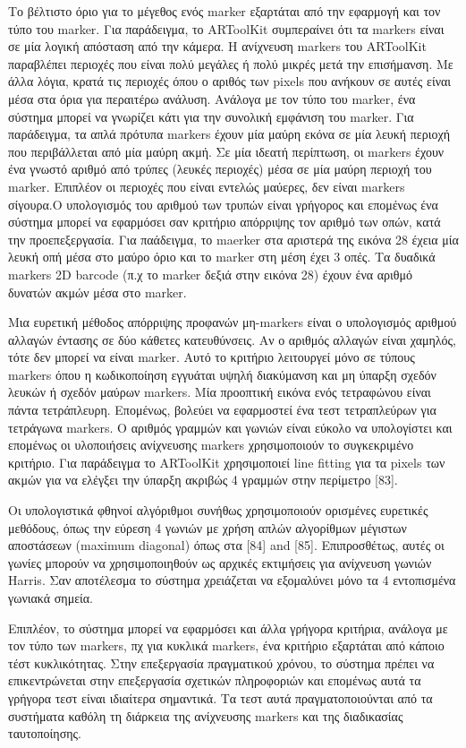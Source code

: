 \begin{itemize}
Το βέλτιστο όριο για το μέγεθος ενός marker εξαρτάται από την εφαρμογή και τον τύπο του marker.
Για παράδειγμα, το ARToolKit συμπεραίνει ότι τα markers είναι σε μία λογική απόσταση από την κάμερα. Η ανίχνευση markers του ARToolKit παραβλέπει περιοχές που είναι πολύ μεγάλες ή πολύ μικρές μετά την επισήμανση. Με άλλα λόγια, κρατά τις περιοχές όπου ο αριθός των pixels που ανήκουν σε αυτές είναι μέσα στα όρια για περαιτέρω ανάλυση.
Ανάλογα με τον τύπο του marker, ένα σύστημα μπορεί να γνωρίζει κάτι για την συνολική εμφάνιση του marker. Για παράδειγμα, τα απλά πρότυπα markers έχουν μία μαύρη εκόνα σε μία λευκή περιοχή που περιβάλλεται από μία μαύρη ακμή.
Σε μία ιδεατή περίπτωση, οι markers έχουν ένα γνωστό αριθμό από τρύπες (λευκές περιοχές) μέσα σε μία μαύρη περιοχή του marker. Επιπλέον οι περιοχές που είναι εντελώς μαύερες, δεν είναι markers σίγουρα.Ο υπολογισμός του αριθμού των τρυπών είναι γρήγορος και επομένως ένα σύστημα μπορεί να εφαρμόσει σαν κριτήριο απόρριψης τον αριθμό των οπών, κατά την προεπεξεργασία. Για παάδειγμα, το maerker στα αριστερά της εικόνα 28 έχεια μία λευκή οπή μέσα στο μαύρο όριο και το marker στη μέση έχει 3 οπές. Τα δυαδικά markers 2D barcode (π.χ το marker δεξιά στην εικόνα 28) έχουν ένα αριθμό δυνατών ακμών μέσα στο marker. 

Μια ευρετική μέθοδος απόρριψης προφανών μη-markers είναι ο υπολογισμός αριθμού αλλαγών έντασης σε δύο κάθετες κατευθύνσεις. Αν ο αριθμός αλλαγών είναι χαμηλός, τότε δεν μπορεί να είναι marker. Αυτό το κριτήριο λειτουργεί μόνο σε τύπους markers όπου η κωδικοποίηση εγγυάται υψηλή διακύμανση και μη ύπαρξη σχεδόν λευκών ή σχεδόν μαύρων markers. 
Μία προοπτική εικόνα ενός τετραφώνου είναι πάντα τετράπλευρη. Επομένως, βολεύει να εφαρμοστεί ένα τεστ τετραπλεύρων για τετράγωνα markers. Ο αριθμός γραμμών και γωνιών είναι εύκολο να υπολογίστει και επομένως οι υλοποιήσεις ανίχνευσης markers χρησιμοποιούν το συγκεκριμένο κριτήριο.
Για παράδειγμα το ARToolKit χρησιμοποιεί line fitting για τα pixels των ακμών για να ελέγξει την ύπαρξη ακριβώς 4 γραμμών στην περίμετρο [83]. 

Οι υπολογιστικά φθηνοί αλγόριθμοι συνήθως χρησιμοποιούν ορισμένες ευρετικές μεθόδους, όπως την εύρεση 4 γωνιών με χρήση απλών αλγορίθμων μέγιστων αποστάσεων (maximum diagonal) όπως στα [84] and [85]. Επιπροσθέτως, αυτές οι γωνίες μπορούν να χρησιμοποιηθούν ως αρχικές εκτιμήσεις για ανίχνευση γωνιών Harris. Σαν αποτέλεσμα το σύστημα χρειάζεται να εξομαλύνει μόνο τα 4 εντοπισμένα γωνιακά σημεία. 

Επιπλέον, το σύστημα μπορεί να εφαρμόσει και άλλα γρήγορα κριτήρια, ανάλογα με τον τύπο των markers, πχ για κυκλικά markers, ένα κριτήριο εξαρτάται από κάποιο τέστ κυκλικότητας. Στην επεξεργασία πραγματικού χρόνου, το σύστημα πρέπει να επικεντρώνεται στην επεξεργασία σχετικών πληροφοριών και επομένως αυτά τα γρήγορα τεστ είναι ιδιαίτερα σημαντικά. Τα τεστ αυτά πραγματοποιούνται από τα συστήματα καθόλη τη διάρκεια της ανίχνευσης markers και της διαδικασίας ταυτοποίησης. 


\end{itemize}

